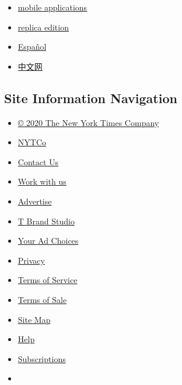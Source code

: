 \begin{itemize}
\tightlist
\item
  \href{http://www.nytimes.com/services/mobile/index.html}{mobile
  applications}
\item
  \href{http://eedition.nytimes.com/cgi-bin/signup.cgi?cc=37FYY}{replica
  edition}
\item
  \href{https://www.nytimes.com/es/}{Español}
\item
  \href{https://cn.nytimes.com/}{中文网}
\end{itemize}

\hypertarget{site-information-navigation}{%
\subsection{Site Information
Navigation}\label{site-information-navigation}}

\begin{itemize}
\tightlist
\item
  \href{https://help.nytimes.com/hc/en-us/articles/115014792127-Copyright-notice}{©
  2020 The New York Times Company}
\end{itemize}

\begin{itemize}
\item
  \href{https://www.nytco.com/}{NYTCo}
\item
  \href{https://help.nytimes.com/hc/en-us/articles/115015385887-Contact-Us}{Contact
  Us}
\item
  \href{https://www.nytco.com/careers/}{Work with us}
\item
  \href{https://nytmediakit.com/}{Advertise}
\item
  \href{http://www.tbrandstudio.com/}{T Brand Studio}
\item
  \href{https://help.nytimes.com/hc/en-us/articles/115014892108-Privacy-policy}{Your
  Ad Choices}
\item
  \href{https://help.nytimes.com/hc/en-us/articles/115014892108-Privacy-policy}{Privacy}
\item
  \href{https://help.nytimes.com/hc/en-us/articles/115014893428-Terms-of-service}{Terms
  of Service}
\item
  \href{https://help.nytimes.com/hc/en-us/articles/115014893968-Terms-of-sale}{Terms
  of Sale}
\item
  \href{https://spiderbites.nytimes.com}{Site Map}
\item
  \href{https://help.nytimes.com/hc/en-us}{Help}
\item
  \href{https://www.nytimes.com/subscription?campaignId=37WXW}{Subscriptions}
\item
\end{itemize}

